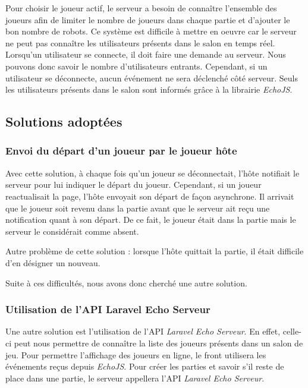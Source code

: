 \documentclass{tnreport}
\begin{document}
Pour choisir le joueur actif, le serveur a besoin de connaître l'ensemble des joueurs afin de limiter le nombre de joueurs dans chaque partie et d'ajouter le bon nombre de robots. Ce système est difficile à mettre en oeuvre car le serveur ne peut pas connaître les utilisateurs présents dans le salon en temps réel. Lorsqu'un utilisateur se connecte, il doit faire une demande au serveur. Nous pouvons donc savoir le nombre d'utilisateurs entrants. Cependant, si un utilisateur se déconnecte, aucun événement ne sera déclenché côté serveur. Seuls les utilisateurs présents dans le salon sont informés grâce à la librairie \textit{EchoJS}.

\subsection{Solutions adoptées}

\subsubsection{Envoi du départ d'un joueur par le joueur hôte}

Avec cette solution, à chaque fois qu'un joueur se déconnectait, l'hôte notifiait le serveur pour lui indiquer le départ du joueur. Cependant, si un joueur reactualisait la page, l'hôte envoyait son départ de façon asynchrone. Il arrivait que le joueur soit revenu dans la partie avant que le serveur ait reçu une notification quant à son départ. De ce fait, le joueur était dans la partie mais le serveur le considérait comme absent.

Autre problème de cette solution : lorsque l'hôte quittait la partie, il était difficile d'en désigner un nouveau.

Suite à ces difficultés, nous avons donc cherché une autre solution.

\subsubsection{Utilisation de l'API Laravel Echo Serveur}

Une autre solution est l'utilisation de l'API \textit{Laravel Echo Serveur}. En effet, celle-ci peut nous permettre de connaître la liste des joueurs présents dans un salon de jeu. Pour permettre l'affichage des joueurs en ligne, le front utilisera les événements reçus depuis \textit{EchoJS}. Pour créer les parties et savoir s'il reste de place dans une partie, le serveur appellera l'API \textit{Laravel Echo Serveur}.
\end{document}
